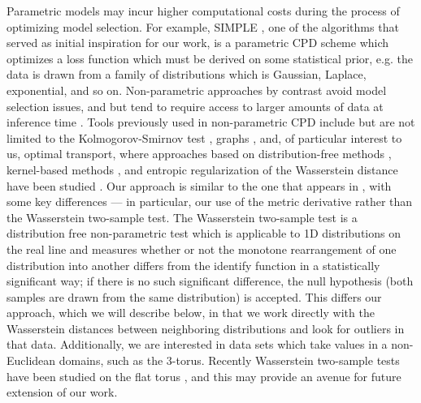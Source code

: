 \documentclass{article}
\begin{document}
Parametric models may incur higher computational costs during the process of optimizing model selection. For example, SIMPLE \cite{IdentifyingLocalizedChanges}, one of the algorithms that served as initial inspiration for our work, is a parametric CPD scheme which optimizes a loss function which must be derived on some statistical prior, e.g. the data is drawn from a family of distributions which is Gaussian, Laplace, exponential, and so on. Non-parametric approaches by contrast avoid model selection issues, and but tend to require access to larger amounts of data at inference time \cite{aminikhanghahiSurveyMethodsTime2017}. Tools previously used in non-parametric CPD include but are not limited to the Kolmogorov-Smirnov test \cite{picardTestingEstimatingChangepoints1985, padillaOptimalNonparametricChange2019, patistOptimalWindowChange2007a}, graphs \cite{chenGraphbasedChangepointDetection2015, chenGraphBasedChangePointAnalysis2023}, and, of particular interest to us, optimal transport, where approaches based on distribution-free methods \cite{chengOptimalTransportBasedModels2023, chengMatchedFilteringStatistical2020, faberWATCHWassersteinChange2021}, kernel-based methods \cite{wangTwoSampleTestKernel2022}, and entropic regularization of the Wasserstein distance have been studied  \cite{werenskiRankEnergyStatistics2024}. Our approach is similar to the one that appears in \cite{chengOptimalTransportBased2020, chengOptimalTransportBasedModels2023}, with some key differences --- in particular, our use of the metric derivative rather than the Wasserstein two-sample test.  The Wasserstein two-sample test \cite{delbarrioTestsGoodnessFit1999, ramdasWassersteinTwoSampleTesting2017} is a distribution free non-parametric test which is applicable to 1D distributions on the real line and measures whether or not the monotone rearrangement of one distribution into another differs from the identify function in a statistically significant way; if there is no such significant difference, the null hypothesis (both samples are drawn from the same distribution) is accepted. This differs our approach, which we will describe below, in that we work directly with the Wasserstein distances between neighboring distributions and look for outliers in that data.  Additionally, we are interested in data sets which take values in a non-Euclidean domains, such as the \(3\)-torus. Recently Wasserstein two-sample tests have been studied on the flat torus \cite{gonzalez-delgadoTwosampleGoodnessoffitTests2023}, and this may provide an avenue for future extension of our work.
\end{document}
